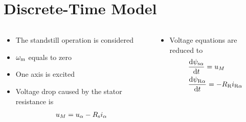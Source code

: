 \documentclass[11pt,aspectratio=169]{beamer}
\begin{document}
\section{ Discrete-Time Model}
\begin{frame}
\begin{columns}
	\begin{column}{.43\textwidth}
\begin{itemize}


	\item The standstill operation is considered
	\item $\omega_{\text{m}}$ equals to zero
	\item One axis is excited 
	\item Voltage drop caused by the stator resistance is
	\begin{align*}
	    u_{M}=u_{\alpha}-R_{\text{s}}i_{\alpha}
	\end{align*} 

\end{itemize}
\end{column}
\begin{column}{.53\textwidth}
	\begin{figure}
		\begin{center}
			
		\end{center}
	\end{figure}
\begin{itemize}
\item Voltage equations are reduced to 
	\begin{align*}
	&\frac{\text{d}\psi_{\text{s}\alpha}}{\text{d} t}=u_{M}\\
	&\frac{\text{d}\psi_{\text{R}\alpha}}{\text{d} t}=-R_{\text{R}}i_{\text{R}\alpha}
	\end{align*}
\end{itemize}
\end{column}
\end{columns}
\end{frame}
\end{document}
